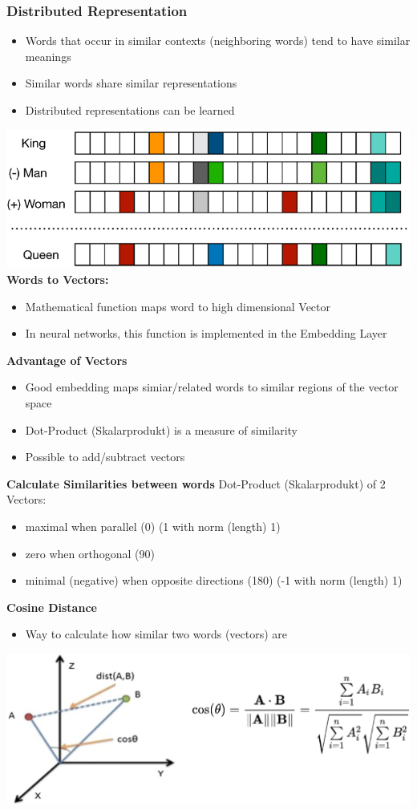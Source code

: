 \subsubsection{Distributed Representation}
\begin{itemize}
    \item Words that occur in similar contexts (neighboring words) tend to have similar meanings
    \item Similar words share similar representations
    \item Distributed representations can be learned
\end{itemize}
\includegraphics[width=.8\linewidth]{./img/distributed_representation.png}\\
\textbf{Words to Vectors:}
\begin{itemize}
    \item Mathematical function maps word to high dimensional Vector
    \item In neural networks, this function is implemented in the Embedding Layer
\end{itemize}
\textbf{Advantage of Vectors}
\begin{itemize}
    \item Good embedding maps simiar/related words to similar regions of the vector space
    \item Dot-Product (Skalarprodukt) is a measure of similarity
    \item Possible to add/subtract vectors
\end{itemize}
\textbf{Calculate Similarities between words}
Dot-Product (Skalarprodukt) of 2 Vectors:
\begin{itemize}
    \item maximal when parallel (0\textdegree) (1 with norm (length) 1)
    \item zero when orthogonal (90\textdegree)
    \item minimal (negative) when opposite directions (180\textdegree) (-1 with norm (length) 1)
\end{itemize}
\textbf{Cosine Distance}
\begin{itemize}
    \item Way to calculate how similar two words (vectors) are
\end{itemize}
\includegraphics[width=\linewidth]{./img/cosine_distance.png}